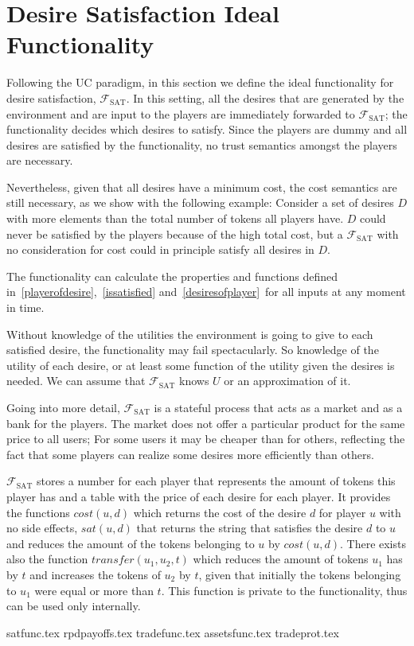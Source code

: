 \section{Desire Satisfaction Ideal Functionality}
  Following the UC paradigm, in this section we define the ideal functionality for desire
  satisfaction, $\mathcal{F}_{\mathrm{SAT}}$. In this setting, all the desires that are
  generated by the environment and are input to the players are immediately forwarded to
  $\mathcal{F}_{\mathrm{SAT}}$; the functionality decides which desires to satisfy. Since
  the players are dummy and all desires are satisfied by the functionality, no trust
  semantics amongst the players are necessary.

  Nevertheless, given that all desires have a minimum cost, the cost semantics are still
  necessary, as we show with the following example: Consider a set of desires $D$ with
  more elements than the total number of tokens all players have. $D$ could never be
  satisfied by the players because of the high total cost, but a
  $\mathcal{F}_{\mathrm{SAT}}$ with no consideration for cost could in principle satisfy
  all desires in $D$.

  The functionality can calculate the properties and functions defined
  in~\ref{playerofdesire},~\ref{issatisfied} and~\ref{desiresofplayer}\ for all inputs at
  any moment in time.

  Without knowledge of the utilities the environment is going to give to each satisfied
  desire, the functionality may fail spectacularly. So knowledge of the utility of each
  desire, or at least some function of the utility given the desires is needed. We can
  assume that $\mathcal{F}_{\mathrm{SAT}}$ knows $U$ or an approximation of it.

  Going into more detail, $\mathcal{F}_{\mathrm{SAT}}$ is a stateful process that acts as
  a market and as a bank for the players. The market does not offer a particular product
  for the same price to all users; For some users it may be cheaper than for others,
  reflecting the fact that some players can realize some desires more efficiently than
  others.

  $\mathcal{F}_{\mathrm{SAT}}$ stores a number for each player that represents the amount
  of tokens this player has and a table with the price of each desire for each player. It
  provides the functions $cost\left(u, d\right)$ which returns the cost of the desire $d$
  for player $u$ with no side effects, $sat\left(u, d\right)$ that returns the string that
  satisfies the desire $d$ to $u$ and reduces the amount of the tokens belonging to $u$ by
  $cost\left(u, d\right)$. There exists also the function $transfer\left(u_1, u_2,
  t\right)$ which reduces the amount of tokens $u_1$ has by $t$ and increases the tokens
  of $u_2$ by $t$, given that initially the tokens belonging to $u_1$ were equal or more
  than $t$. This function is private to the functionality, thus can be used only
  internally.

  {satfunc.tex}
  {rpdpayoffs.tex}
  {tradefunc.tex}
  {assetsfunc.tex}
  {tradeprot.tex}
